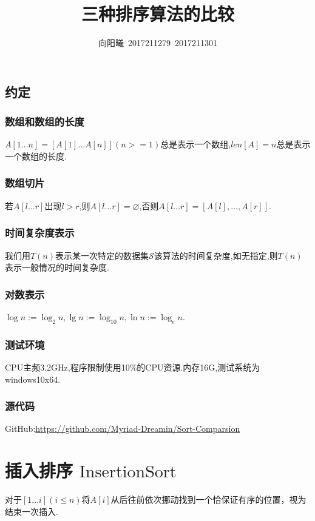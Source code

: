 \documentclass[UTF8]{ctexart}
\title{三种排序算法的比较}
\author{向阳曦\ 2017211279\ 2017211301}
\date{}
\begin{document}
\setlength{\parindent}{2em}
\setlength{\baselineskip}{2.5em}
\maketitle
\tableofcontents
\newpage
\subsection{约定}
\subsubsection{数组和数组的长度}
$A[1...n]=[A[1]...A[n]](n>=1)$总是表示一个数组,$len[A]=n$总是表示一个数组的长度.
\subsubsection{数组切片}
若$A[l...r]$出现$l>r$,则$A[l...r]=\varnothing$,否则$A[l...r]=[A[l],\dots,A[r]]$.
\subsubsection{时间复杂度表示}
我们用$T(n)$表示某一次特定的数据集$\mathcal{S}$该算法的时间复杂度,如无指定,则$T(n)$表示一般情况的时间复杂度.
\subsubsection{对数表示}
$\log n:=\log_2 n,\lg n := \log_{10} n, \ln n := \log_{e}n$.
\subsubsection{测试环境}
CPU主频3.2GHz,程序限制使用10\%的CPU资源.内存16G,测试系统为windows10x64.
\subsubsection{源代码}
GitHub:\url{https://github.com/Myriad-Dreamin/Sort-Comparsion}
\newpage

\section{插入排序 $\mathrm{InsertionSort}$}
对于$[1...i](i\leqslant n)$将$A[i]$从后往前依次挪动找到一个恰保证有序的位置，视为结束一次插入.
\end{document}
